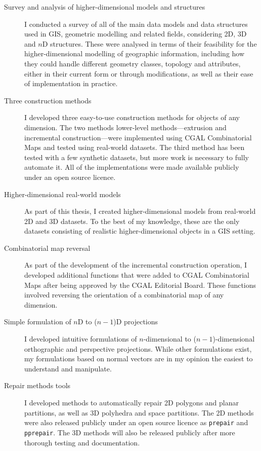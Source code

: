 \begin{description}

\item[Survey and analysis of higher-dimensional models and structures] I conducted a survey of all of the main data models and data structures used in GIS, geometric modelling and related fields, considering 2D, 3D and $n$D structures.
These were analysed in terms of their feasibility for the higher-dimensional modelling of geographic information, including how they could handle different geometry classes, topology and attributes, either in their current form or through modifications, as well as their ease of implementation in practice.

\item[Three construction methods] I developed three easy-to-use construction methods for objects of any dimension.
The two methods lower-level methods---extrusion and incremental construction---were implemented using CGAL Combinatorial Maps and tested using real-world datasets.
The third method has been tested with a few synthetic datasets, but more work is necessary to fully automate it.
All of the implementations were made available publicly under an open source licence.

\item[Higher-dimensional real-world models] As part of this thesis, I created higher-dimensional models from real-world 2D and 3D datasets.
To the best of my knowledge, these are the only datasets consisting of realistic higher-dimensional objects in a GIS setting.

\item[Combinatorial map reversal] As part of the development of the incremental construction operation, I developed additional functions that were added to CGAL Combinatorial Maps after being approved by the CGAL Editorial Board.
These functions involved reversing the orientation of a combinatorial map of any dimension.

\item[Simple formulation of $n$D to ($n-1$)D projections] I developed intuitive formulations of $n$-dimensional to ($n-1$)-dimensional orthographic and perspective projections.
While other formulations exist, my formulations based on normal vectors are in my opinion the easiest to understand and manipulate.

\item[Repair methods tools] I developed methods to automatically repair 2D polygons and planar partitions, as well as 3D polyhedra and space partitions.
The 2D methods were also released publicly under an open source licence as \texttt{prepair} and \texttt{pprepair}.
The 3D methods will also be released publicly after more thorough testing and documentation.

\end{description}

